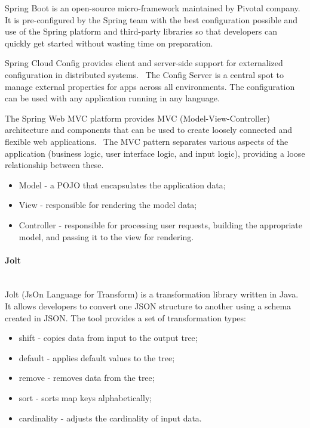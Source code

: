 Spring Boot is an open-source micro-framework maintained by Pivotal company.~\cite{spring-boot} It is pre-configured by the Spring team with the best configuration possible and use of the Spring platform and third-party libraries so that developers can quickly get started without wasting time on preparation.

Spring Cloud Config provides client and server-side support for externalized configuration in distributed systems.~\cite{spring-cloud-config} The Config Server is a central spot to manage external properties for apps across all environments. The configuration can be used with any application running in any language.

The Spring Web MVC platform provides MVC (Model-View-Controller) architecture and components that can be used to create loosely connected and flexible web applications.~\cite{spring-mvc} The MVC pattern separates various aspects of the application (business logic, user interface logic, and input logic), providing a loose relationship between these.

\begin{itemize}
    \item Model - a POJO that encapsulates the application data;
    \item View - responsible for rendering the model data;
    \item Controller - responsible for processing user requests, building the appropriate model, and passing it to the view for rendering.
\end{itemize}

\paragraph{\large{Jolt}}\mbox{}\\[2pt]
Jolt (JsOn Language for Transform) is a transformation library written in Java.~\cite{jolt} It allows developers to convert one JSON structure to another using a schema created in JSON. The tool provides a set of transformation types:

\begin{itemize}
    \item shift - copies data from input to the output tree;
    \item default - applies default values to the tree;
    \item remove - removes data from the tree;
    \item sort - sorts map keys alphabetically;
    \item cardinality - adjusts the cardinality of input data.
\end{itemize}

